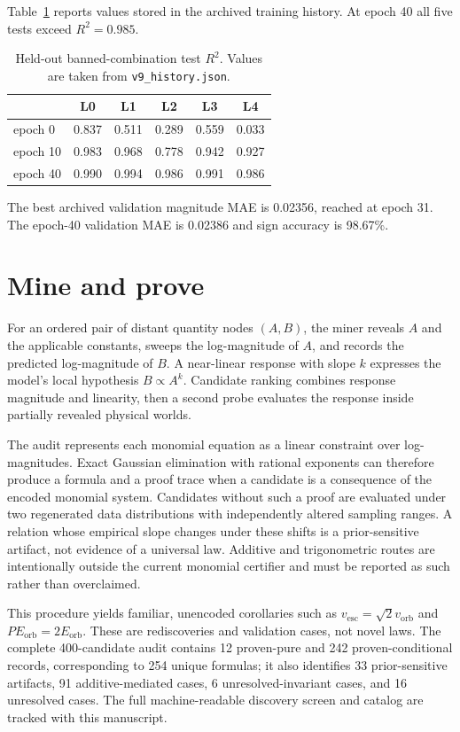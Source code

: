 \documentclass[11pt]{article}
\begin{document}
Table~\ref{tab:ladder} reports values stored in the archived training history. At epoch 40 all five tests exceed $R^2=0.985$.

\begin{table}[h]
\centering\small
\begin{tabular}{lccccc}
\toprule
 & L0 & L1 & L2 & L3 & L4\\
\midrule
epoch 0  & 0.837 & 0.511 & 0.289 & 0.559 & 0.033\\
epoch 10 & 0.983 & 0.968 & 0.778 & 0.942 & 0.927\\
epoch 40 & 0.990 & 0.994 & 0.986 & 0.991 & 0.986\\
\bottomrule
\end{tabular}
\caption{Held-out banned-combination test $R^2$. Values are taken from \texttt{v9\_history.json}.}
\label{tab:ladder}
\end{table}

The best archived validation magnitude MAE is 0.02356, reached at epoch 31. The epoch-40 validation MAE is 0.02386 and sign accuracy is 98.67\%.

\section{Mine and prove}

For an ordered pair of distant quantity nodes $(A,B)$, the miner reveals $A$ and the applicable constants, sweeps the log-magnitude of $A$, and records the predicted log-magnitude of $B$. A near-linear response with slope $k$ expresses the model's local hypothesis $B\propto A^k$. Candidate ranking combines response magnitude and linearity, then a second probe evaluates the response inside partially revealed physical worlds.

The audit represents each monomial equation as a linear constraint over log-magnitudes. Exact Gaussian elimination with rational exponents can therefore produce a formula and a proof trace when a candidate is a consequence of the encoded monomial system. Candidates without such a proof are evaluated under two regenerated data distributions with independently altered sampling ranges. A relation whose empirical slope changes under these shifts is a prior-sensitive artifact, not evidence of a universal law. Additive and trigonometric routes are intentionally outside the current monomial certifier and must be reported as such rather than overclaimed.

This procedure yields familiar, unencoded corollaries such as $v_{\mathrm{esc}}=\sqrt{2}v_{\mathrm{orb}}$ and $PE_{\mathrm{orb}}=2E_{\mathrm{orb}}$. These are rediscoveries and validation cases, not novel laws. The complete 400-candidate audit contains 12 proven-pure and 242 proven-conditional records, corresponding to 254 unique formulas; it also identifies 33 prior-sensitive artifacts, 91 additive-mediated cases, 6 unresolved-invariant cases, and 16 unresolved cases. The full machine-readable discovery screen and catalog are tracked with this manuscript.
\end{document}

